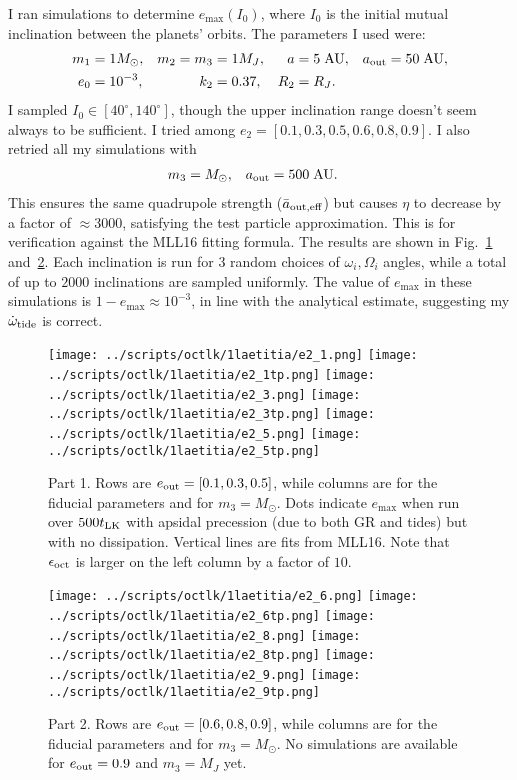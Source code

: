 \documentclass[11pt,
        usenames, %
        dvipsnames %
    ]{article}
\begin{document}
I ran simulations to determine $e_{\max}(I_0)$, where $I_0$ is the initial
mutual inclination between the planets' orbits. The parameters I used were:
\begin{align*}
    m_1 &= 1M_{\odot}, &
    m_2 = m_3 &= 1M_J, &
    a &= 5\;\mathrm{AU}, &
    a_{\rm out} &= 50\;\mathrm{AU},\\
    e_0 &= 10^{-3}, &
    k_2 &= 0.37, &
    R_2 &= R_J.
\end{align*}
I sampled $I_0 \in [40^\circ, 140^\circ]$, though the upper inclination range
doesn't seem always to be sufficient. I tried among $e_2 = [0.1, 0.3, 0.5, 0.6,
0.8, 0.9]$. I also retried all my simulations with
\begin{align*}
    m_3 &= M_{\odot}, &
    a_{\rm out} &= 500\;\mathrm{AU}.
\end{align*}
This ensures the same quadrupole strength ($\bar{a}_{\rm out, eff}$) but causes
$\eta$ to decrease by a factor of $\approx 3000$, satisfying the test
particle approximation. This is for verification against the MLL16 fitting
formula. The results are shown in Fig.~\ref{fig:p1} and~\ref{fig:p2}. Each
inclination is run for $3$ random choices of $\omega_i, \Omega_i$ angles, while
a total of up to $2000$ inclinations are sampled uniformly. The value of
$e_{\max}$ in these simulations is $1 - e_{\max} \approx 10^{-3}$, in line with
the analytical estimate, suggesting my $\dot{\omega}_{\rm tide}$ is correct.
\begin{figure}
    \centering
    \texttt{[image: ../scripts/octlk/1laetitia/e2\_1.png]}
    \texttt{[image: ../scripts/octlk/1laetitia/e2\_1tp.png]}
    \texttt{[image: ../scripts/octlk/1laetitia/e2\_3.png]}
    \texttt{[image: ../scripts/octlk/1laetitia/e2\_3tp.png]}
    \texttt{[image: ../scripts/octlk/1laetitia/e2\_5.png]}
    \texttt{[image: ../scripts/octlk/1laetitia/e2\_5tp.png]}
    \caption{Part 1. Rows are $e_{\rm out} = [0.1, 0.3, 0.5]$, while columns are
    for the fiducial parameters and for $m_3 = M_{\odot}$. Dots indicate
    $e_{\max}$ when run over $500 t_{\rm LK}$ with apsidal precession (due to
    both GR and tides) but with no dissipation. Vertical lines are fits from
    MLL16. Note that $\epsilon_{\rm oct}$ is larger on the left column by a
    factor of $10$.}\label{fig:p1}
\end{figure}
\begin{figure}
    \centering
    \texttt{[image: ../scripts/octlk/1laetitia/e2\_6.png]}
    \texttt{[image: ../scripts/octlk/1laetitia/e2\_6tp.png]}
    \texttt{[image: ../scripts/octlk/1laetitia/e2\_8.png]}
    \texttt{[image: ../scripts/octlk/1laetitia/e2\_8tp.png]}
    \texttt{[image: ../scripts/octlk/1laetitia/e2\_9.png]}
    \texttt{[image: ../scripts/octlk/1laetitia/e2\_9tp.png]}
    \caption{Part 2. Rows are $e_{\rm out} = [0.6, 0.8, 0.9]$, while columns are
    for the fiducial parameters and for $m_3 = M_{\odot}$. No simulations are
    available for $e_{\rm out} = 0.9$ and $m_3 = M_J$ yet.}\label{fig:p2}
\end{figure}
\end{document}
